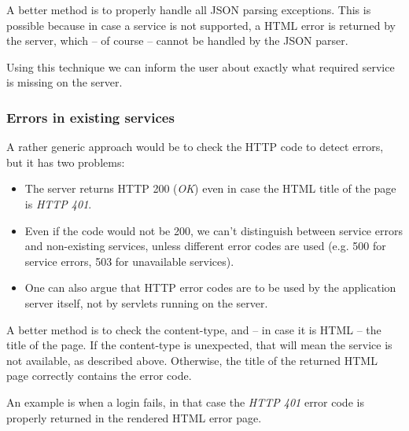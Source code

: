 A better method is to properly handle all JSON parsing exceptions. This is
possible because in case a service is not supported, a HTML error is returned
by the server, which -- of course -- cannot be handled by the JSON parser.

Using this technique we can inform the user about exactly what required service
is missing on the server.

\subsubsection*{Errors in existing services}

A rather generic approach would be to check the HTTP code to detect errors, but it has two problems:

\begin{itemize}
\item The server returns HTTP 200 (\emph{OK}) even in case the HTML title of the page is \emph{HTTP 401}.
\item Even if the code would not be 200, we can't distinguish between service errors and non-existing services, unless different error codes are used (e.g. 500 for service errors, 503 for unavailable services).
\item One can also argue that HTTP error codes are to be used by the application server itself, not by servlets running on the server.
\end{itemize}

A better method is to check the content-type, and -- in case it is HTML -- the
title of the page.  If the content-type is unexpected, that will mean the
service is not available, as described above. Otherwise, the title of the
returned HTML page correctly contains the error code.

An example is when a login fails, in that case the \emph{HTTP 401} error code
is properly returned in the rendered HTML error page.
